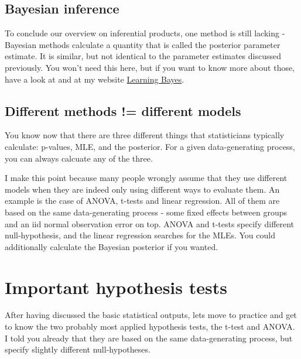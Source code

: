 \documentclass[a4paper,twoside]{tufte-book}\usepackage[]{graphicx}\usepackage[]{color}
\begin{document}
{\subsection{Bayesian inference}

To conclude our overview on inferential products, one method is still lacking - Bayesian methods calculate a quantity that is called the posterior parameter estimate. It is similar, but not identical to the parameter estimates discussed previously. You won't need this here, but if you want to know more about those, have a look at \citep{Gelman-BayesianDataAnalysis-2003} and at my website \href{http://florianhartig.github.io/LearningBayes/}{Learning Bayes}.

\subsection{Different methods != different models}

You know now that there are three different things that statisticians typically calculate: p-values, MLE, and the posterior. For a given data-generating process, you can always calcuate any of the three.

I make this point because many people wrongly assume that they use different models when they are indeed only using different ways to evaluate them. An example is the case of ANOVA, t-tests and linear regression. All of them are based on the same data-generating process - some fixed effects between groups and an iid normal observation error on top. ANOVA and t-tests specify different null-hypothesis, and the linear regression searches for the MLEs. You could additionally calculate the Bayesian posterior if you wanted.

\section{Important hypothesis tests}

After having discussed the basic statistical outputs, lets move to practice and get to know the two probably most applied hypothesis tests, the t-test and ANOVA. I told you already that they are based on the same data-generating process, but specify slightly different null-hypotheses. 

}
\end{document}
